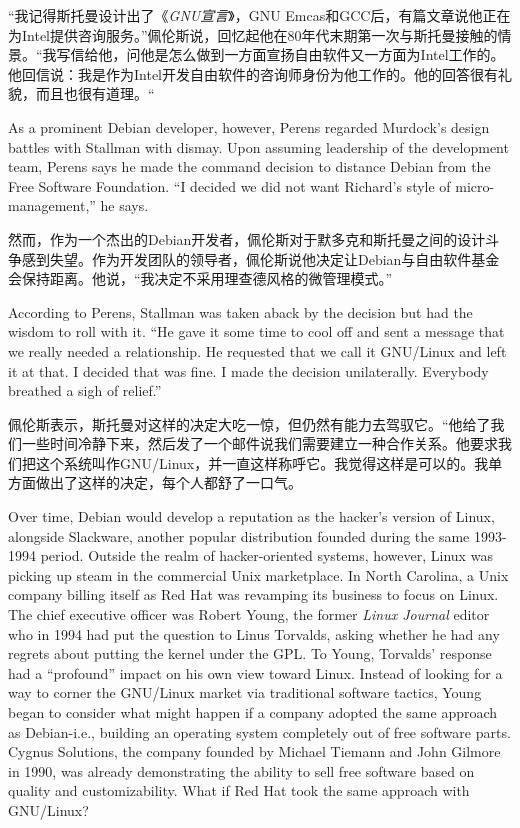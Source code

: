 \ifdefined\chs
``我记得斯托曼设计出了《\textit{GNU宣言}》，GNU Emcas和GCC后，有篇文章说他正在为Intel提供咨询服务。''佩伦斯说，回忆起他在80年代末期第一次与斯托曼接触的情景。``我写信给他，问他是怎么做到一方面宣扬自由软件又一方面为Intel工作的。他回信说：我是作为Intel开发自由软件的咨询师身份为他工作的。他的回答很有礼貌，而且也很有道理。``
\fi

\ifdefined\eng
As a prominent Debian developer, however, Perens regarded Murdock's design battles with Stallman with dismay. Upon assuming leadership of the development team, Perens says he made the command decision to distance Debian from the Free Software Foundation. ``I decided we did not want Richard's style of micro-management,'' he says.
\fi

\ifdefined\chs
然而，作为一个杰出的Debian开发者，佩伦斯对于默多克和斯托曼之间的设计斗争感到失望。作为开发团队的领导者，佩伦斯说他决定让Debian与自由软件基金会保持距离。他说，``我决定不采用理查德风格的微管理模式。''
\fi

\ifdefined\eng
According to Perens, Stallman was taken aback by the decision but had the wisdom to roll with it. ``He gave it some time to cool off and sent a message that we really needed a relationship. He requested that we call it GNU/Linux and left it at that. I decided that was fine. I made the decision unilaterally. Everybody breathed a sigh of relief.''
\fi

\ifdefined\chs
佩伦斯表示，斯托曼对这样的决定大吃一惊，但仍然有能力去驾驭它。``他给了我们一些时间冷静下来，然后发了一个邮件说我们需要建立一种合作关系。他要求我们把这个系统叫作GNU/Linux，并一直这样称呼它。我觉得这样是可以的。我单方面做出了这样的决定，每个人都舒了一口气。
\fi

\ifdefined\eng
Over time, Debian would develop a reputation as the hacker's version of Linux, alongside Slackware, another popular distribution founded during the same 1993-1994 period. Outside the realm of hacker-oriented systems, however, Linux was picking up steam in the commercial Unix marketplace. In North Carolina, a Unix company billing itself as Red Hat was revamping its business to focus on Linux. The chief executive officer was Robert Young, the former \textit{Linux Journal} editor who in 1994 had put the question to Linus Torvalds, asking whether he had any regrets about putting the kernel under the GPL. To Young, Torvalds' response had a ``profound'' impact on his own view toward Linux. Instead of looking for a way to corner the GNU/Linux market via traditional software tactics, Young began to consider what might happen if a company adopted the same approach as Debian-i.e., building an operating system completely out of free software parts. Cygnus Solutions, the company founded by Michael Tiemann and John Gilmore in 1990, was already demonstrating the ability to sell free software based on quality and customizability. What if Red Hat took the same approach with GNU/Linux?

